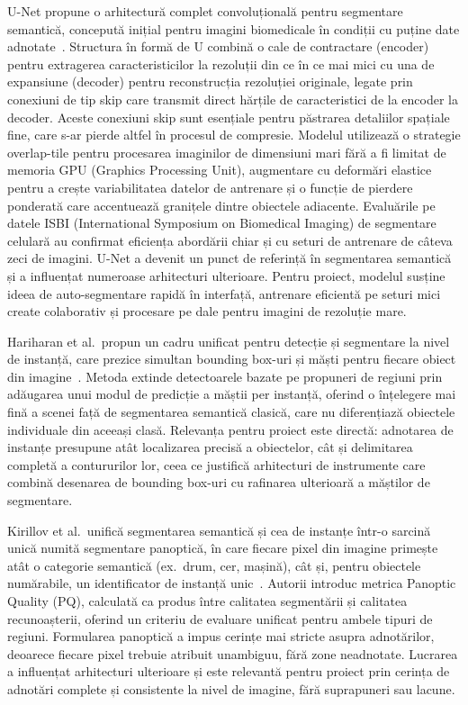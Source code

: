 U-Net propune o arhitectură complet convoluțională pentru segmentare semantică, concepută inițial pentru imagini biomedicale în condiții cu puține date adnotate~\cite{ronneberger2015unetconvolutionalnetworksbiomedical}. Structura în formă de U combină o cale de contractare (encoder) pentru extragerea caracteristicilor la rezoluții din ce în ce mai mici cu una de expansiune (decoder) pentru reconstrucția rezoluției originale, legate prin conexiuni de tip skip care transmit direct hărțile de caracteristici de la encoder la decoder. Aceste conexiuni skip sunt esențiale pentru păstrarea detaliilor spațiale fine, care s-ar pierde altfel în procesul de compresie. Modelul utilizează o strategie overlap-tile pentru procesarea imaginilor de dimensiuni mari fără a fi limitat de memoria GPU (Graphics Processing Unit), augmentare cu deformări elastice pentru a crește variabilitatea datelor de antrenare și o funcție de pierdere ponderată care accentuează granițele dintre obiectele adiacente. Evaluările pe datele ISBI (International Symposium on Biomedical Imaging) de segmentare celulară au confirmat eficiența abordării chiar și cu seturi de antrenare de câteva zeci de imagini. U-Net a devenit un punct de referință în segmentarea semantică și a influențat numeroase arhitecturi ulterioare. Pentru proiect, modelul susține ideea de auto-segmentare rapidă în interfață, antrenare eficientă pe seturi mici create colaborativ și procesare pe dale pentru imagini de rezoluție mare.

Hariharan et al.\ propun un cadru unificat pentru detecție și segmentare la nivel de instanță, care prezice simultan bounding box-uri și măști pentru fiecare obiect din imagine~\cite{hariharan2014simultaneousdetectionsegmentation}. Metoda extinde detectoarele bazate pe propuneri de regiuni prin adăugarea unui modul de predicție a măștii per instanță, oferind o înțelegere mai fină a scenei față de segmentarea semantică clasică, care nu diferențiază obiectele individuale din aceeași clasă. Relevanța pentru proiect este directă: adnotarea de instanțe presupune atât localizarea precisă a obiectelor, cât și delimitarea completă a contururilor lor, ceea ce justifică arhitecturi de instrumente care combină desenarea de bounding box-uri cu rafinarea ulterioară a măștilor de segmentare.

Kirillov et al.\ unifică segmentarea semantică și cea de instanțe într-o sarcină unică numită segmentare panoptică, în care fiecare pixel din imagine primește atât o categorie semantică (ex.\ drum, cer, mașină), cât și, pentru obiectele numărabile, un identificator de instanță unic~\cite{kirillov2019panopticsegmentation}. Autorii introduc metrica Panoptic Quality (PQ), calculată ca produs între calitatea segmentării și calitatea recunoașterii, oferind un criteriu de evaluare unificat pentru ambele tipuri de regiuni. Formularea panoptică a impus cerințe mai stricte asupra adnotărilor, deoarece fiecare pixel trebuie atribuit unambiguu, fără zone neadnotate. Lucrarea a influențat arhitecturi ulterioare și este relevantă pentru proiect prin cerința de adnotări complete și consistente la nivel de imagine, fără suprapuneri sau lacune.

